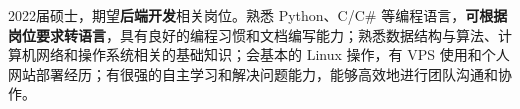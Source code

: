 \ifzh
    \onehalfspacing\hspace{2em}%
    2022届硕士，期望\textbf{后端开发}相关岗位。熟悉 Python、C/C\# 等编程语言，\textbf{可根据岗位要求转语言}，具有良好的编程习惯和文档编写能力；熟悉数据结构与算法、计算机网络和操作系统相关的基础知识；会基本的 Linux 操作，有 VPS 使用和个人网站部署经历；有很强的自主学习和解决问题能力，能够高效地进行团队沟通和协作。
\else
\fi